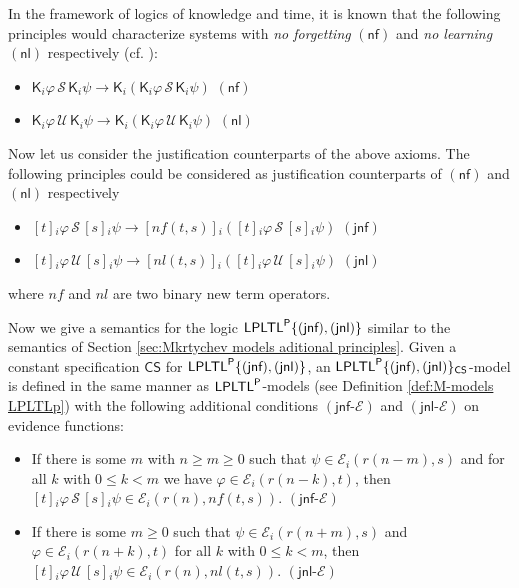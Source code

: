 \documentclass[envcountsect,envcountsame,oribibl,orivec]{llncs}
\newcommand{\limplies}{\rightarrow}
\newcommand{\luntil}{{\,\mathcal{U}\,}}
\newcommand{\lsince}{{\,\mathcal{S}\,}}
\newcommand{\LPLTLp}{\textsf{LPLTL}^{\sf P}}
\newcommand{\lknows}{\mathsf{K}}
\newcommand{\nlax}{\ensuremath{(\textsf{nl})}}
\newcommand{\jnlax}{\ensuremath{(\textsf{jnl})}}
\newcommand{\jnfax}{\ensuremath{(\textsf{jnf})}}
\newcommand{\nfax}{\ensuremath{(\textsf{nf})}}
\newcommand{\jbox}[1]{\left[#1\right]\!}
\newcommand{\CS}{\textsf{CS}}
\newcommand{\agent}{i}
\newcommand{\jnfevidence}{\ensuremath{(\textsf{jnf-}\evidence)}}
\newcommand{\jnlevidence}{\ensuremath{(\textsf{jnl-}\evidence)}}
\newcommand{\evidence}{\mathcal{E}}
\renewcommand{\phi}{\varphi}
\begin{document}
In the framework of logics of knowledge and time, it is known that the following principles would characterize systems with \textit{no forgetting} $\nfax$ and \textit{no learning} $\nlax$ respectively (cf. \cite{FHMV95,HvdMV04}):
%
\begin{itemize}
	\item $\lknows_\agent \phi \lsince \lknows_\agent \psi \limplies \lknows_\agent(\lknows_\agent  \phi \lsince \lknows_\agent \psi)$ \hfill \nfax
	
	\item $\lknows_\agent \phi \luntil \lknows_\agent \psi \limplies \lknows_\agent(\lknows_\agent  \phi \luntil \lknows_\agent \psi)$ \hfill \nlax
\end{itemize}
%
Now let us consider the justification counterparts of the above axioms. The following principles could be considered as justification counterparts of $\nfax$ and $\nlax$ respectively
%
\begin{itemize}
	\item $\jbox{t}_\agent \phi \lsince \jbox{s}_\agent \psi \limplies \jbox{nf(t,s)}_\agent(\jbox{t}_\agent \phi \lsince \jbox{s}_\agent \psi)$ \hfill \jnfax
	
	\item $\jbox{t}_\agent \phi \luntil \jbox{s}_\agent \psi \limplies \jbox{nl(t,s)}_\agent(\jbox{t}_\agent \phi \luntil \jbox{s}_\agent \psi)$ \hfill \jnlax
\end{itemize}
%
where $nf$ and $nl$ are two binary new term operators.

Now we give a semantics for the logic $\LPLTLp \{ \jnfax, \jnlax \}$ similar to the semantics of Section \ref{sec:Mkrtychev models aditional principles}. Given a constant specification $\CS$ for $\LPLTLp \{ \jnfax, \jnlax \}$, an $\LPLTLp \{ \jnfax, \jnlax \}_\CS$-model is defined in the same manner as $\LPLTLp$-models (see Definition \ref{def:M-models LPLTLp}) with the following additional conditions $\jnfevidence$ and $\jnlevidence$ on evidence functions:

\begin{itemize}
	\item If there is some $m$ with $n \geq m \geq 0$ such that  $\psi \in \evidence_\agent (r(n-m),s)$ and for all $k$ with $0 \leq k < m$ we have $\phi \in \evidence_\agent (r(n-k),t)$, then $\jbox{t}_\agent \phi \lsince \jbox{s}_\agent \psi \in \evidence_\agent(r(n), nf(t,s))$. \hfill $\jnfevidence$
	
	\item If there is some  $m \geq 0$ such that  $\psi \in \evidence_\agent(r(n+m),s)$  and $\phi \in \evidence_\agent(r(n+k),t)$ for all $k$ with $0 \leq k < m$, then $\jbox{t}_\agent \phi \luntil \jbox{s}_\agent \psi \in \evidence_\agent(r(n),nl(t,s))$. \hfill $\jnlevidence$
\end{itemize} 
\end{document}
